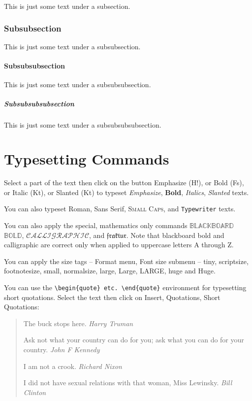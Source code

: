 \documentclass{report}%
\begin{document}
This is just some text under a subsection.

\subsubsection{Subsubsection}

This is just some text under a subsubsection.

\paragraph{Subsubsubsection}

This is just some text under a subsubsubsection.

\subparagraph{Subsubsubsubsection}

This is just some text under a subsubsubsubsection.

\section{Typesetting Commands}

Select a part of the text then click on the button Emphasize (H!),
or Bold (Fs), or Italic (Kt), or Slanted (Kt) to typeset
\emph{Emphasize}, \textbf{Bold}, \textit{Italics},
\textsl{Slanted} texts.

You can also typeset \textrm{Roman}, \textsf{Sans Serif},
\textsc{Small Caps}, and \texttt{Typewriter} texts.

You can also apply the special, mathematics only commands
$\mathbb{BLACKBOARD}$ $\mathbb{BOLD}$, $\mathcal{CALLIGRAPHIC}$,
and $\mathfrak{fraktur}$. Note that blackboard bold and
calligraphic are correct only when applied to uppercase letters A
through Z.

You can apply the size tags -- Format menu, Font size submenu --
{\tiny tiny}, {\scriptsize scriptsize}, {\footnotesize
footnotesize}, {\small small}, {\normalsize normalsize}, {\large
large}, {\Large Large}, {\LARGE LARGE}, {\huge huge} and {\Huge
Huge}.

You can use the \verb"\begin{quote} etc. \end{quote}" environment
for typesetting short quotations. Select the text then click on
Insert, Quotations, Short Quotations:

\begin{quote}
The buck stops here. \emph{Harry Truman}

Ask not what your country can do for you; ask what you can do for
your country. \emph{John F Kennedy}

I am not a crook. \emph{Richard Nixon}

I did not have sexual relations with that woman, Miss Lewinsky.
\emph{Bill Clinton}
\end{quote}
\end{document}
